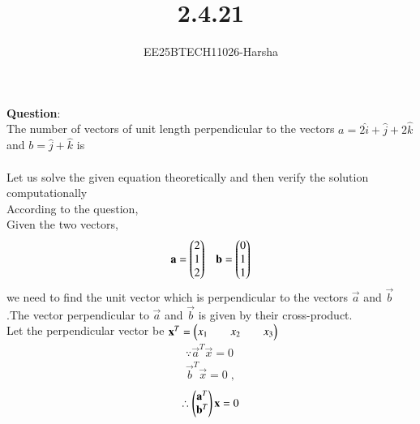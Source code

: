 \documentclass[journal]{IEEEtran}
\begin{document}

\vspace{3cm}

\title{2.4.21}
\author{EE25BTECH11026-Harsha}
 \maketitle
{\let\newpage\relax\maketitle}

\renewcommand{\thefigure}{\theenumi}
\renewcommand{\thetable}{\theenumi}
\setlength{\intextsep}{10pt} %


\renewcommand{\thetable}{\theenumi}

\textbf{Question}:\\
The number of vectors of unit length perpendicular to the vectors $a = 2\hat{i} + \hat{j} + 2\hat{k}$ and $b = \hat{j} + \hat{k} $ is\\ 
\solution \\
Let us solve the given equation theoretically and then verify the solution computationally \\
According to the question,\\
Given the two vectors,
\begin{align}
    \vec{a}=\myvec{2\\1\\2} \;\;\; \vec{b}=\myvec{0\\1\\1}
\end{align}
we need to find the unit vector which is perpendicular to the vectors $\vec{a}$ and $\vec{b}$.The vector perpendicular to $\vec{a}$ and $\vec{b}$ is given by their cross-product.\\
Let the perpendicular vector be $\vec{x}^T=\myvec{x_1&&x_2&&x_3}$
\begin{align}
    \because \vec{a}^T\vec{x}=0\\
    \vec{b}^T\vec{x}=0\;,
\end{align}
\begin{align}
    \therefore \myvec{\vec{a}^T\\\vec{b}^T}\vec{x}=0
\end{align}
\end{document}
